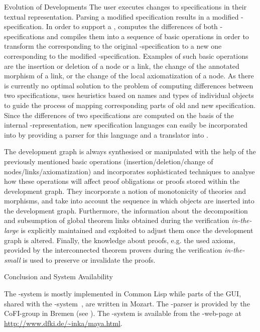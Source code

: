 \begin{omgroup}[id=maya,short=Maya,creators={autexier,hutter,mossakowski,shairer}]
\begin{omgroup}{Evolution of Developments}
The user executes changes to specifications in their textual representation.  Parsing a
modified specification results in a modified {\dgrl}-specification. In order to support a
{}, {\maya} computes the differences of both
{\dgrl}-specifications and compiles them into a sequence of basic operations in order to
transform the {} corresponding to the original
{\dgrl}-specification to a new one corresponding to the modified
{\dgrl}-specification. Examples of such basic operations are the insertion or deletion of
a node or a link, the change of the annotated morphism of a link, or the change of the
local axiomatization of a node. As there is currently no optimal solution to the problem
of computing differences between two specifications, {\maya} uses heuristics based on
names and types of individual objects to guide the process of mapping corresponding parts
of old and new specification. Since the differences of two specifications are computed on
the basis of the internal {\dgrl}-representation, new specification languages can easily
be incorporated into {\maya} by providing a parser for this language and a translator into
{\dgrl}.

The development graph is always synthesised or manipulated with the help of the
previously mentioned basic operations (insertion\slash deletion\slash change of
nodes\slash links\slash axiomatization) and {\maya} incorporates sophisticated
techniques to analyse how these operations will affect proof obligations or proofs
stored within the development graph. They incorporate a notion of monotonicity of
theories and morphisms, and take into account the sequence in which objects are
inserted into the development graph. Furthermore, the information about the
decomposition and subsumption of global theorem links obtained during the
verification {\emph{in-the-large}} is explicitly
maintained and exploited to adjust them once the development graph is altered.
Finally, the knowledge about proofs, e.g. the used axioms, provided by the
interconnected theorem provers during the verification
{\emph{in-the-small}} is used to preserve or
invalidate the proofs.
\end{omgroup}

\begin{omgroup}{Conclusion and System Availability}

The {\maya}-system is mostly implemented in Common Lisp while parts of the GUI, shared
with the {\OMEGA}-system~\cite{SieHes:loui99}, are written in Mozart. The {\casl}-parser
is provided by the CoFI-group in Bremen (see {}). The {\maya}-system is
available from the {\maya}-web-page at {\url{http://www.dfki.de/~inka/maya.html}}.


\end{omgroup}
\end{omgroup}
